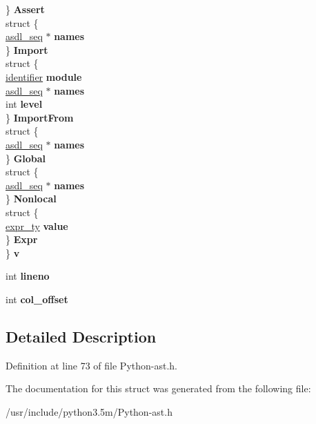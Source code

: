 \begin{DoxyCompactItemize}
\begin{tabbing}
\>\} {\bfseries Assert}\\
\>struct \{\\
\>\>\hyperlink{structasdl__seq}{asdl\_seq} $\ast$ {\bfseries names}\\
\>\} {\bfseries Import}\\
\>struct \{\\
\>\>\hyperlink{struct__object}{identifier} {\bfseries module}\\
\>\>\hyperlink{structasdl__seq}{asdl\_seq} $\ast$ {\bfseries names}\\
\>\>int {\bfseries level}\\
\>\} {\bfseries ImportFrom}\\
\>struct \{\\
\>\>\hyperlink{structasdl__seq}{asdl\_seq} $\ast$ {\bfseries names}\\
\>\} {\bfseries Global}\\
\>struct \{\\
\>\>\hyperlink{structasdl__seq}{asdl\_seq} $\ast$ {\bfseries names}\\
\>\} {\bfseries Nonlocal}\\
\>struct \{\\
\>\>\hyperlink{struct__expr}{expr\_ty} {\bfseries value}\\
\>\} {\bfseries Expr}\\
\} {\bfseries v}\hypertarget{struct__stmt_aa10ac64037298a1f81a402e731dae03d}{}\label{struct__stmt_aa10ac64037298a1f81a402e731dae03d}
\\

\end{tabbing}\item 
int {\bfseries lineno}\hypertarget{struct__stmt_a80852961a5875977df5769033d8039d4}{}\label{struct__stmt_a80852961a5875977df5769033d8039d4}

\item 
int {\bfseries col\+\_\+offset}\hypertarget{struct__stmt_aa2948b6a670a4b66a09dc3eaf022bbf2}{}\label{struct__stmt_aa2948b6a670a4b66a09dc3eaf022bbf2}

\end{DoxyCompactItemize}


\subsection{Detailed Description}


Definition at line 73 of file Python-\/ast.\+h.



The documentation for this struct was generated from the following file\+:\begin{DoxyCompactItemize}
\item 
/usr/include/python3.\+5m/Python-\/ast.\+h\end{DoxyCompactItemize}
